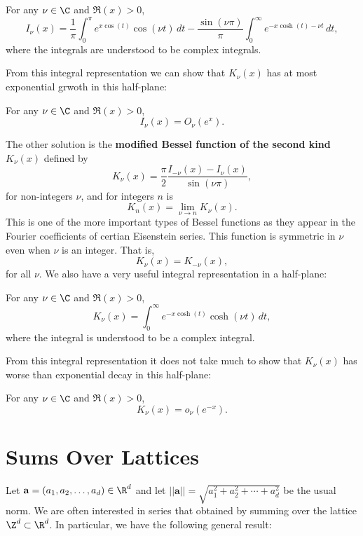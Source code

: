     \begin{proposition}\label{prop:integral_representation_I-Bessel_function}
      For any $\nu \in \C$ and $\Re(x) > 0$,
      \[
        I_{\nu}(x) = \frac{1}{\pi}\int_{0}^{\pi}e^{x\cos(t)}\cos(\nu t)\,dt-\frac{\sin(\nu\pi)}{\pi}\int_{0}^{\infty}e^{-x\cosh(t)-\nu t}\,dt,
      \]
      where the integrals are understood to be complex integrals.
    \end{proposition}

    From this integral representation we can show that $K_{\nu}(x)$ has at most exponential grwoth in this half-plane:

    \begin{lemma}\label{lem:exponential_growth_I-Bessel_function}
      For any $\nu \in \C$ and $\Re(x) > 0$,
      \[
        I_{\nu}(x) = O_{\nu}(e^{x}).
      \]
    \end{lemma}

    The other solution is the \textbf{modified Bessel function of the second kind} $K_{\nu}(x)$ defined by
    \[
      K_{\nu}(x) = \frac{\pi}{2}\frac{I_{-\nu}(x)-I_{\nu}(x)}{\sin(\nu\pi)},
    \]
    for non-integers $\nu$, and for integers $n$ is
    \[
      K_{n}(x)= \lim_{\nu \to n}K_{\nu}(x).
    \]
    This is one of the more important types of Bessel functions as they appear in the Fourier coefficients of certian Eisenstein series. This function is symmetric in $\nu$ even when $\nu$ is an integer. That is,
    \[
      K_{\nu}(x) = K_{-\nu}(x),
    \]
    for all $\nu$. We also have a very useful integral representation in a half-plane:

    \begin{proposition}\label{prop:integral_representation_K-Bessel_function}
      For any $\nu \in \C$ and $\Re(x) > 0$,
      \[
        K_{\nu}(x) = \int_{0}^{\infty}e^{-x\cosh(t)}\cosh(\nu t)\,dt,
      \]
      where the integral is understood to be a complex integral.
    \end{proposition}

    From this integral representation it does not take much to show that $K_{\nu}(x)$ has worse than exponential decay in this half-plane:

    \begin{lemma}\label{lem:exponential_decay_K-Bessel_function}
      For any $\nu \in \C$ and $\Re(x) > 0$,
      \[
        K_{\nu}(x) = o_{\nu}(e^{-x}).
      \]
    \end{lemma}
  \section{Sums Over Lattices}
    Let $\mathbf{a} = (a_{1},a_{2},\ldots,a_{d}) \in \R^{d}$ and let $||\mathbf{a}|| = \sqrt{a_{1}^{2}+a_{2}^{2}+\cdots+a_{d}^{2}}$ be the usual norm. We are often interested in series that obtained by summing over the lattice $\Z^{d} \subset \R^{d}$. In particular, we have the following general result:

